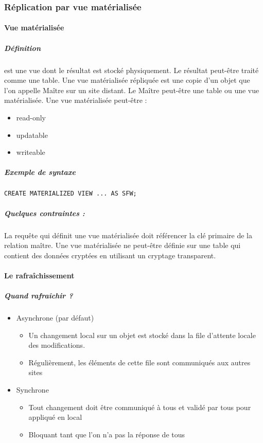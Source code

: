 \documentclass[10pt,a4paper,twoside]{article}
\begin{document}
\subsubsection{Réplication par vue matérialisée}

\paragraph{Vue matérialisée}
\subparagraph{Définition} est une vue dont le résultat est stocké physiquement. Le résultat peut-être traité comme une table. Une vue matérialisée répliquée est une copie d'un objet que l'on appelle Maître sur un site distant. Le Maître peut-être une table ou une vue matérialisée. Une vue matérialisée peut-être :
\begin{itemize}
\item read-only
\item updatable
\item writeable
\end{itemize}

\subparagraph{Exemple de syntaxe}
\begin{verbatim}
CREATE MATERIALIZED VIEW ... AS SFW;
\end{verbatim}

\subparagraph{Quelques contraintes :} La requête qui définit une vue matérialisée doit référencer la clé primaire de la relation maître. Une vue matérialisée ne peut-être définie sur une table qui contient des données cryptées en utilisant un cryptage transparent.

\paragraph{Le rafraîchissement}
\subparagraph{Quand rafraîchir ?}
\begin{itemize}
\item Asynchrone (par défaut)
\begin{itemize}
\item Un changement local sur un objet est stocké dans la file d'attente locale des modifications.
\item Régulièrement, les éléments de cette file sont communiqués aux autres sites
\end{itemize}
\item Synchrone
\begin{itemize}
\item Tout changement doit être communiqué à tous et validé par tous pour appliqué en local
\item Bloquant tant que l'on n'a pas la réponse de tous
\end{itemize}
\end{itemize}
\end{document}
